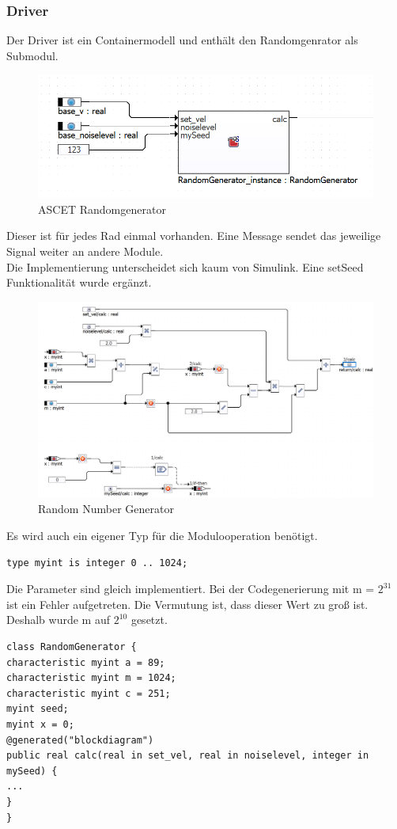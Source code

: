 \subsubsection{Driver}
Der Driver ist ein Containermodell und enthält den Randomgenrator als Submodul.
\begin{figure}[H]
	\centering
	\includegraphics[width=0.7\linewidth]{../Graphiken/ASCETRandomgen.png}
	\caption{ASCET Randomgenerator}
	\label{fig:ASCETRandom}
\end{figure}
Dieser ist für jedes Rad einmal vorhanden. Eine Message sendet das jeweilige Signal weiter an andere Module.\\
Die Implementierung unterscheidet sich kaum von Simulink. Eine setSeed Funktionalität wurde ergänzt.
\begin{figure}[H]
	\centering
	\includegraphics[width=1\linewidth]{../Graphiken/RandomGenerator.png}
	\caption{Random Number Generator}
	\label{fig:RandomGenerator}
\end{figure}
Es wird auch ein eigener Typ für die Modulooperation benötigt.
\begin{lstlisting}
type myint is integer 0 .. 1024;
\end{lstlisting}
Die Parameter sind gleich implementiert. Bei der Codegenerierung mit m = $2^{31}$ ist ein Fehler aufgetreten. Die Vermutung ist, dass dieser Wert zu groß ist. Deshalb wurde m auf $2^{10}$ gesetzt.
\begin{lstlisting}
class RandomGenerator {
characteristic myint a = 89;
characteristic myint m = 1024;
characteristic myint c = 251;
myint seed;
myint x = 0;
@generated("blockdiagram")
public real calc(real in set_vel, real in noiselevel, integer in mySeed) {
...
}
}
\end{lstlisting}

